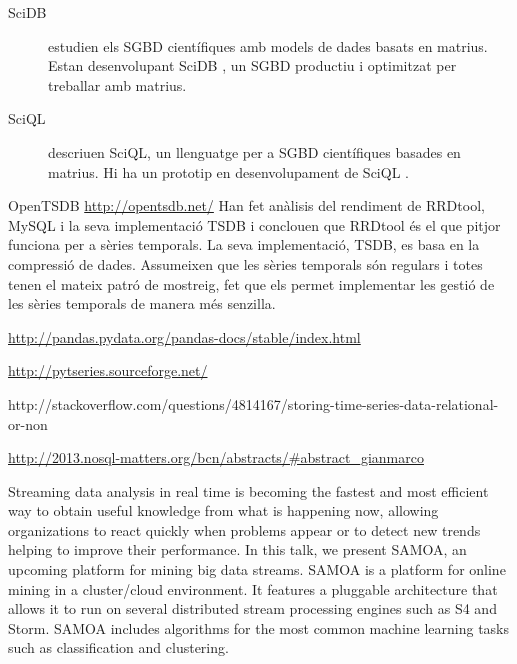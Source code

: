 \begin{description}
\item[SciDB]
\textcite{stonebraker09:scidb} estudien els SGBD científiques amb models  de dades basats en matrius. Estan desenvolupant SciDB \parencite{scidb}, un SGBD productiu i optimitzat per treballar amb matrius.


\item[SciQL]
\textcite{kersten11} descriuen SciQL, un llenguatge per a SGBD científiques basades en matrius. Hi ha un prototip en desenvolupament de SciQL \parencite{sciql}.


\end{description}


\todo{}


OpenTSDB \cite{deri12:tsdb_compressed_database}
\url{http://opentsdb.net/}
Han fet anàlisis del rendiment de RRDtool, MySQL i la seva implementació TSDB i conclouen que RRDtool és el que pitjor funciona per a sèries temporals. La seva implementació, TSDB, es basa en la compressió de dades. Assumeixen que les sèries temporals són regulars i totes tenen el mateix patró de mostreig, fet que els permet implementar les gestió de les sèries temporals de manera més senzilla.




\url{http://pandas.pydata.org/pandas-docs/stable/index.html}

\url{http://pytseries.sourceforge.net/}



http://stackoverflow.com/questions/4814167/storing-time-series-data-relational-or-non



\url{http://2013.nosql-matters.org/bcn/abstracts/#abstract_gianmarco}

Streaming data analysis in real time is becoming the fastest and most efficient way to obtain useful knowledge from what is happening now, allowing organizations to react quickly when problems appear or to detect new trends helping to improve their performance. In this talk, we present SAMOA, an upcoming platform for mining big data streams. SAMOA is a platform for online mining in a cluster/cloud environment. It features a pluggable architecture that allows it to run on several distributed stream processing engines such as S4 and Storm. SAMOA includes algorithms for the most common machine learning tasks such as classification and clustering. 






